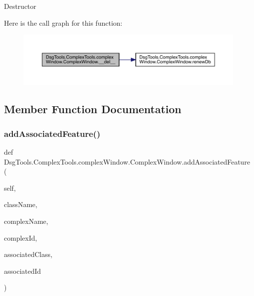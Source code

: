 \begin{DoxyVerb}Destructor
\end{DoxyVerb}
 Here is the call graph for this function\+:
\nopagebreak
\begin{figure}[H]
\begin{center}
\leavevmode
\includegraphics[width=350pt]{class_dsg_tools_1_1_complex_tools_1_1complex_window_1_1_complex_window_ab89113472e2ef4fc591f7c188aa752b9_cgraph}
\end{center}
\end{figure}


\subsection{Member Function Documentation}
\mbox{\label{class_dsg_tools_1_1_complex_tools_1_1complex_window_1_1_complex_window_a4f094ed4f9f97ce5e04041e2a84487b2}} 
\subsubsection{\texorpdfstring{add\+Associated\+Feature()}{addAssociatedFeature()}}
{\footnotesize\ttfamily def Dsg\+Tools.\+Complex\+Tools.\+complex\+Window.\+Complex\+Window.\+add\+Associated\+Feature (\begin{DoxyParamCaption}\item[{}]{self,  }\item[{}]{class\+Name,  }\item[{}]{complex\+Name,  }\item[{}]{complex\+Id,  }\item[{}]{associated\+Class,  }\item[{}]{associated\+Id }\end{DoxyParamCaption})}

